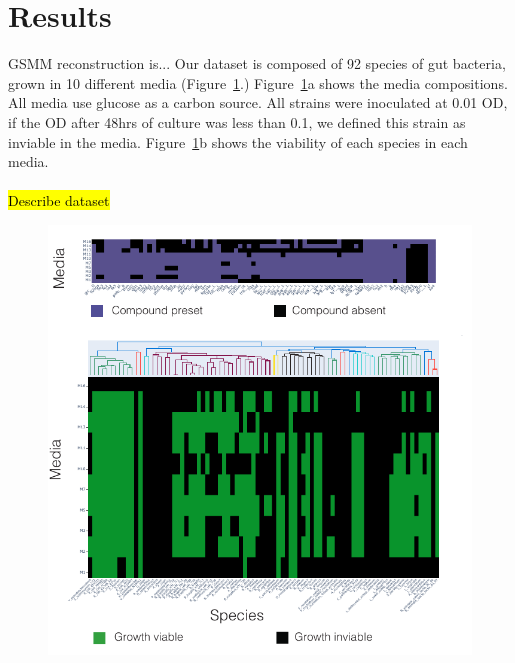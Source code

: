 \documentclass[11pt,a4paper]{article}
\begin{document}
\section{Results}
GSMM reconstruction is...
Our dataset is composed of 92 species of gut bacteria, grown in 10 different media (Figure~\ref{fig:FIG_dataset}.) Figure~\ref{fig:FIG_dataset}a shows the media compositions. All media use glucose as a carbon source. All strains were inoculated at 0.01 OD, if the OD after 48hrs of culture was less than 0.1, we defined this strain as inviable in the media. Figure~\ref{fig:FIG_dataset}b shows the viability of each species in each media.
\\\\
\hl{Describe dataset}
\begin{figure}[tbp]
    \includegraphics[width=\textwidth]{figures/FIG_dataset/FIG_dataset.pdf}
    \caption{}
    \label{fig:FIG_dataset}
 \end{figure}
\end{document}
